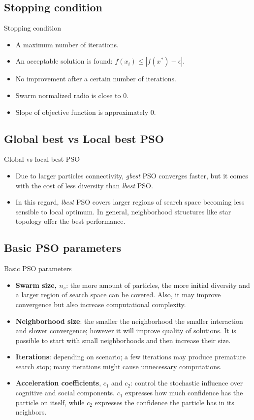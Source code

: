 \documentclass[aspectratio=169,compress,10pt]{beamer}
\begin{document}
\subsection{Stopping condition}
\begin{frame}{Stopping condition}
\begin{itemize}
	\item A maximum number of iterations.
	\item An acceptable solution is found: $f(x_i) \leq |f(x^*) - \epsilon |$.
	\item No improvement after a certain number of iterations.
	\item Swarm normalized radio is close to 0.
	\item Slope of objective function is approximately 0.
\end{itemize}
\end{frame}

\subsection{Global best vs Local best PSO}
\begin{frame}{Global vs local best PSO}
\begin{itemize}
	\item Due to larger particles connectivity, \emph{gbest} PSO converges faster, but it comes with the cost of less diversity than \emph{lbest} PSO.
	\item In this regard, \emph{lbest} PSO covers larger regions of search space becoming less sensible to local optimum.
	In general, neighborhood structures like star topology offer the best performance.
\end{itemize}
\end{frame}


\subsection{Basic PSO parameters}
\begin{frame}{Basic PSO parameters}
\begin{itemize}
	\item \textbf{Swarm size, $n_s$}: the more amount of particles, the more initial diversity and a larger region of search space can be covered.
	Also, it may improve convergence but also increase computational complexity.
	\item \textbf{Neighborhood size}: the smaller the neighborhood the smaller interaction and slower convergence; however it will improve quality of solutions.
	It is possible to start with small neighborhoods and then increase their size.
	\item \textbf{Iterations}: depending on scenario; a few iterations may produce premature search stop; many iterations might cause unnecessary computations.
	\item \textbf{Acceleration coefficients}, $c_1$ and $c_2$: control the stochastic influence over cognitive and social components. 
	$c_1$ expresses how much confidence has the particle on itself, while  $c_2$ expresses the confidence the particle has in its neighbors.
\end{itemize}
\end{frame}
\end{document}
